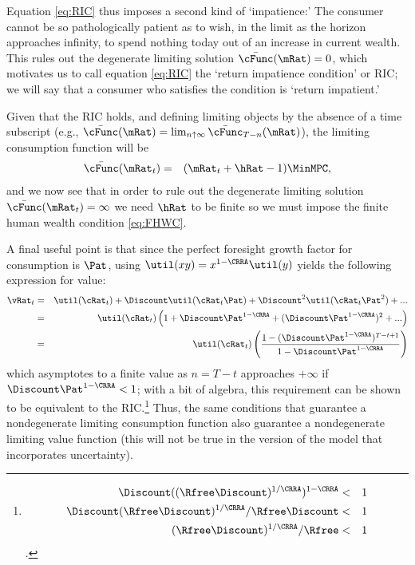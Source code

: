 \documentclass[titlepage]{\econtex}\providecommand{\texname}{BufferStockTheory}%
\begin{document}
Equation \eqref{eq:RIC} thus imposes a second kind of `impatience:' The consumer cannot be so pathologically patient as to wish, in the limit as the horizon approaches infinity, to spend nothing today out of an increase in current wealth.  This rules out the degenerate limiting solution $\bar{\cFunc}(\mRat)=0$, which motivates us to call equation \eqref{eq:RIC} the `return impatience condition' or RIC; we will say that a consumer who satisfies the condition is `return impatient.'

Given that the RIC holds, and defining limiting objects by the absence of a time subscript (e.g., $\bar{\cFunc}(\mRat)=\lim_{n \uparrow \infty} \bar{\cFunc}_{T-n}(\mRat)$), the limiting consumption function will be
\begin{eqnarray}
  \bar{\cFunc}(\mRat_{t}) & = & (\mRat_{t}+\hRat-1)\MinMPC, \label{eq:cFuncPFUnc}
\end{eqnarray}
and we now see that in order to rule out the degenerate limiting
solution $\bar{\cFunc}(\mRat_{t}) = \infty$ we need $\hRat$ to be finite so we
must impose the finite human wealth condition \eqref{eq:FHWC}.

A final useful point is that since the perfect foresight
growth factor for consumption is $\Pat$, using $\util(xy) =
x^{1-\CRRA}\util(y)$ yields the following expression for value:
\begin{eqnarray*}
  \vRat_{t} & = & \util(\cRat_{t})+\Discount \util(\cRat_{t}\Pat)+\Discount^{2} \util(\cRat_{t} \Pat^{2})+...
\\ & = & \util(\cRat_{t})\left(1+\Discount \Pat^{1-\CRRA}+(\Discount \Pat^{1-\CRRA})^{2}+...\right)
\\ & = & \util(\cRat_{t})\left(\frac{1-(\Discount \Pat^{1-\CRRA})^{T-t+1}}{1-\Discount \Pat^{1-\CRRA}}\right)
\end{eqnarray*}
which asymptotes to a finite value as $n=T-t$ approaches $+\infty$ if
$\Discount \Pat^{1-\CRRA} < 1$; with a bit of algebra, this
requirement can be shown to be equivalent to the RIC.\footnote{
\begin{eqnarray*}
   \Discount ((\Rfree \Discount)^{1/\CRRA})^{1-\CRRA} & < & 1
\\ \Discount (\Rfree\Discount)^{1/\CRRA}/\Rfree\Discount & < & 1
\\ (\Rfree \Discount)^{1/\CRRA} /\Rfree & < & 1
\end{eqnarray*}.
}  Thus, the same conditions that guarantee a nondegenerate limiting consumption function also guarantee a nondegenerate limiting value function (this will not be true in the version of the model that incorporates uncertainty).
\end{document}
